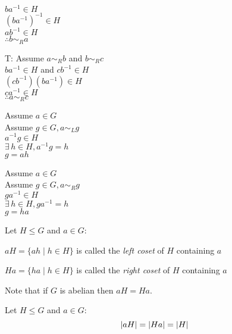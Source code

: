 \documentclass[letterpaper,12pt,fleqn]{article}
\renewcommand{\l}{\sim_L}
\renewcommand{\r}{\sim_R}
\begin{document}
\begin{theproof}
\begin{minipage}{3in}
\begin{description}
      $ba^{-1}\in H$ \\
      $(ba^{-1})^{-1}\in H$ \\
      $ab^{-1}\in H$ \\
      $\therefore b\r a$
    \item{T}: Assume $a\r b$ and $b\r c$ \\
      $ba^{-1}\in H$ and $cb^{-1}\in H$ \\
      $(cb^{-1})(ba^{-1})\in H$ \\
      $ca^{-1}\in H$ \\
      $\therefore a\r c$
    \end{description}
  \end{minipage}
\end{theproof}

\begin{minipage}{3in}
  Assume $a\in G$ \\
  Assume $g\in G,a\l g$ \\
  $a^{-1}g\in H$ \\
  $\exists\,h\in H,a^{-1}g=h$ \\
  $g=ah$
\end{minipage}
\begin{minipage}{3in}
  Assume $a\in G$ \\
  Assume $g\in G,a\r g$ \\
  $ga^{-1}\in H$ \\
  $\exists\,h\in H,ga^{-1}=h$ \\
  $g=ha$
\end{minipage}

\begin{definition}
  Let $H\le G$ and $a\in G$:

  $aH=\{ah\mid h\in H\}$ is called the \emph{left coset} of $H$ containing $a$

  $Ha=\{ha\mid h\in H\}$ is called the \emph{right coset} of $H$ containing $a$
\end{definition}

Note that if $G$ is abelian then $aH=Ha$.

\begin{theorem}
  Let $H\le G$ and $a\in G$:
  \[\lvert aH\rvert=\lvert Ha\rvert=\lvert H\rvert\]
\end{theorem}
\end{document}
